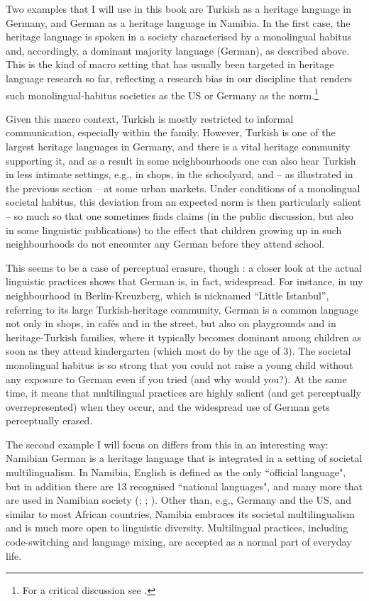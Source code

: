 Two examples that I will use in this book are Turkish as a heritage language in Germany, and German as a heritage language in Namibia. In the first case, the heritage language is spoken in a society characterised by a monolingual habitus and, accordingly, a dominant majority language (German), as described above. This is the kind of macro setting that has usually been targeted in heritage language research so far, reflecting a research bias in our discipline that renders such monolingual-habitus societies as the US or Germany as the norm.\footnote{For a critical discussion see \citet{WieseEtal2022_continuum, KerswillWiese2022}.}

Given this macro context, Turkish is mostly restricted to informal communication, especially within the family. However, Turkish is one of the largest heritage languages in Germany, and there is a vital heritage community supporting it, and as a result in some neighbourhoods one can also hear Turkish in less intimate settings, e.g., in shops, in the schoolyard, and – as illustrated in the previous section – at some urban markets. Under conditions of a monolingual societal habitus, this deviation from an expected norm is then particularly salient – so much so that one sometimes finds claims (in the public discussion, but also in some linguistic publications) to the effect that children growing up in such neighbourhoods do not encounter any German before they attend school.

This seems to be a case of perceptual erasure, though \citep{WieseEtal2022_multilinguals}: a closer look at the actual linguistic practices shows that German is, in fact, widespread. For instance, in my neighbourhood in Berlin-Kreuzberg, which is nicknamed “Little Istanbul”, referring to its large Turkish-heritage community, German is a common language not only in shops, in cafés and in the street, but also on playgrounds and in heritage-Turkish families, where it typically becomes dominant among children as soon as they attend kindergarten (which most do by the age of 3). The societal monolingual habitus is so strong that you could not raise a young child without any exposure to German even if you tried (and why would you?). At the same time, it means that multilingual practices are highly salient (and get perceptually overrepresented) when they occur, and the widespread use of German gets perceptually erased.

The second example I will focus on differs from this in an interesting way: Namibian German is a heritage language that is integrated in a setting of societal multilingualism. In Namibia, English is defined as the only “official language", but in addition there are 13 recognised “national languages", and many more that are used in Namibian society (\citealt{WieseEtal2017}; \citealt{ShahZappen-Thomson2018}; \citealt{Zimmer2021}). Other than, e.g., Germany and the US, and similar to most African countries, Namibia embraces its societal multilingualism and is much more open to linguistic diversity. Multilingual practices, including code-switching and language mixing, are accepted as a normal part of everyday life.

